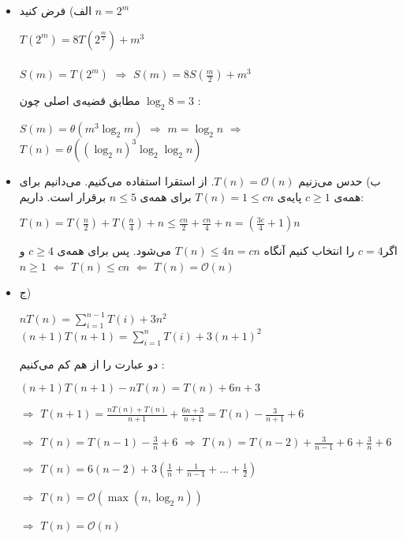 \begin{RTL}
\begin{itemize}
\item الف) فرض کنید $ n = 2^{m}$\\
\begin{LTR}
$T(2^{m}) = 8T(2^{\frac{m}{2}}) + m^{3}$ \\
\\
$S(m) = T(2^{m})$ $\Rightarrow$  $S(m) = 8S(\frac{m}{2}) + m^{3}$\\


\end{LTR}
مطابق قضیه‌ی اصلی چون $\log_2 8 = 3$ :\\
\begin{LTR}
$S(m) = \theta(m^{3} \log_2 m)$ $\Rightarrow$ $m = \log_2 n$
$\Rightarrow$  $T(n) = \theta((\log_2 n)^{3} \log_2 \log_2 n )$
\end{LTR}


\item ب) حدس می‌زنیم $T(n)= \mathcal{O}(n)$. از استقرا استفاده می‌کنیم. می‌دانیم برای همه‌ی 
$c\geq1$ پایه‌ی $T(n)= 1 \leq cn$ برای همه‌ی $n\leq 5 $ برقرار است. داریم:   \\
\begin{LTR}
$T(n) = T(\frac{n}{2}) + T(\frac{n}{4}) + n \leq \frac{cn}{2}+\frac{cn}{4} + n = (\frac{3c}{4}+1)n$
\end{LTR}

اگر$c = 4$  را انتخاب کنیم آنگاه $T(n)\leq 4n = cn$ می‌شود. پس برای همه‌ی $c\geq 4$ و $n\geq 1$ $\Leftarrow$ $T(n)\leq cn$ $\Leftarrow$  $T(n)= \mathcal{O}(n)$\\

\item ج)
\begin{LTR}
$nT(n) = \sum_{i = 1}^{n-1} T(i) + 3n^{2}$\\


$(n+1) T(n+1) = \sum_{i = 1}^{n} T(i) + 3(n+1)^{2}$

\end{LTR}
دو عبارت را از هم کم می‌کنیم :
\begin{LTR}
$(n+1)T(n+1) - nT(n) = T(n) + 6n + 3$ 

$\Rightarrow$ $T(n+1) = \frac{nT(n) + T(n)}{n+1} + \frac{6n+3}{n+1} = T(n) -\frac{3}{n+1} + 6 $ 

$\Rightarrow$ $T(n) = T(n-1) - \frac{3}{n} + 6$ $\Rightarrow$ $T(n) = T(n-2) + \frac{3}{n-1} + 6 + \frac{3}{n} + 6$

$\Rightarrow$ $T(n) = 6(n-2) + 3(\frac{1}{n} + \frac{1}{n-1} +...+ \frac{1}{2})$

$\Rightarrow$ $T(n) = \mathcal{O}(\max{(n,\log_2 n)})$

$\Rightarrow$ $T(n) = \mathcal{O}(n)$
\end{LTR}
\end{itemize}

\end{RTL}